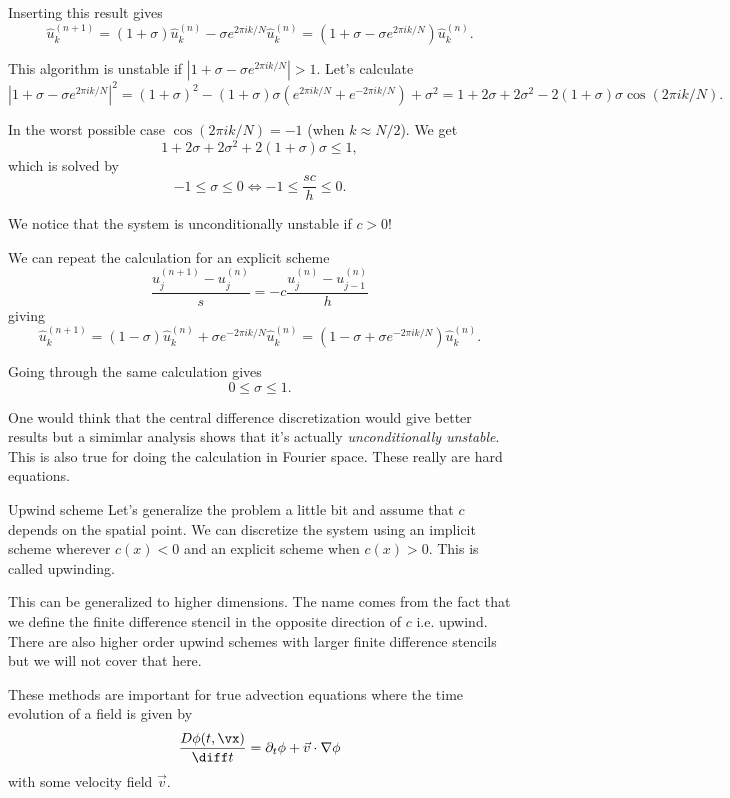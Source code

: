 \begin{frame}
	Inserting this result gives
	\[ \hat{u}_{k}^{(n+1)} = (1 + \sigma ) \hat{u}_{k}^{(n)} - \sigma e^{2\pi i k/N} \hat{u}_{k}^{(n)} 
	= (1 + \sigma - \sigma e^{2\pi i k/N} )\hat{u}_{k}^{(n)}.
	\]
	
	\pause
	This algorithm is unstable if $ |1 + \sigma - \sigma e^{2\pi i k/N} | > 1 $. Let's calculate
	\[ |1 + \sigma - \sigma e^{2\pi i k/N} |^2 = (1+\sigma)^2 - (1+\sigma)\sigma( e^{2\pi i k/N} + e^{-2\pi i k/N} ) + \sigma^2 = 1 + 2\sigma + 2\sigma^2 - 2(1+\sigma)\sigma \cos(2\pi i k /N). \]
	
	\pause
	In the worst possible case $ \cos(2\pi i k /N) = -1 $ (when $ k \approx N/2 $). We get 
	\[ 1 + 2\sigma + 2\sigma^2 + 2(1+\sigma)\sigma \leq 1,  \]
	which is solved by
	\[ -1 \leq \sigma \leq 0 \Leftrightarrow -1 \leq \frac{sc}{h} \leq 0. \]
	
	\pause
	We notice that the system is unconditionally unstable if $ c>0 $!
\end{frame}

\begin{frame}
	We can repeat the calculation for an explicit scheme
	\[ \frac{u_{j}^{(n+1)} - u_{j}^{(n)}}{s} = -c \frac{u_{j}^{(n)} - u_{j-1}^{(n)}}{h} \]
	giving
	\[ \hat{u}_{k}^{(n+1)} = (1 - \sigma ) \hat{u}_{k}^{(n)} + \sigma e^{-2\pi i k/N} \hat{u}_{k}^{(n)}  
	= (1 - \sigma + \sigma e^{-2\pi i k/N})\hat{u}_{k}^{(n)} .
	\]
	
	\pause
	Going through the same calculation gives 
	\[ 0 \leq \sigma \leq 1. \]
	
	\pause
	One would think that the central difference discretization would give better results but a simimlar analysis shows that it's actually \emph{unconditionally unstable}. This is also true for doing the calculation in Fourier space. These really are hard equations.
\end{frame}

\begin{frame}{Upwind scheme}
	Let's generalize the problem a little bit and assume that $ c $ depends on the spatial point. We can discretize the system using an implicit scheme wherever $ c(x) < 0 $ and an explicit scheme when $ c(x) > 0 $. This is called \alert{upwinding}. 
	
	\pause
	This can be generalized to higher dimensions. The name comes from the fact that we define the finite difference stencil in the opposite direction of $ c $ i.e. upwind. There are also higher order upwind schemes with larger finite difference stencils but we will not cover that here. 
	
	\pause
	These methods are important for true advection equations where the time evolution of a field is given by
	\[ \frac{D \phi(t,\vx)}{\diff t} = \partial_t \phi + \vec{v} \cdot \nabla \phi \]
	with some velocity field $ \vec{v} $. 
\end{frame}



